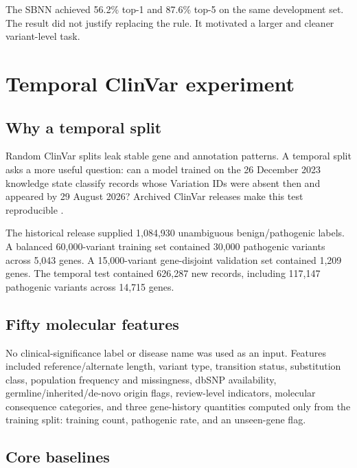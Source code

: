 \documentclass[11pt]{article}
\begin{document}
The SBNN achieved 56.2\% top-1 and 87.6\% top-5 on the same development set. The result did not justify replacing the rule. It motivated a larger and cleaner variant-level task.

\section{Temporal ClinVar experiment}

\subsection{Why a temporal split}

Random ClinVar splits leak stable gene and annotation patterns. A temporal split asks a more useful question: can a model trained on the 26 December 2023 knowledge state classify records whose Variation IDs were absent then and appeared by 29 August 2026? Archived ClinVar releases make this test reproducible \citep{clinvar}.

The historical release supplied 1,084,930 unambiguous benign/pathogenic labels. A balanced 60,000-variant training set contained 30,000 pathogenic variants across 5,043 genes. A 15,000-variant gene-disjoint validation set contained 1,209 genes. The temporal test contained 626,287 new records, including 117,147 pathogenic variants across 14,715 genes.
\subsection{Fifty molecular features}

No clinical-significance label or disease name was used as an input. Features included reference/alternate length, variant type, transition status, substitution class, population frequency and missingness, dbSNP availability, germline/inherited/de-novo origin flags, review-level indicators, molecular consequence categories, and three gene-history quantities computed only from the training split: training count, pathogenic rate, and an unseen-gene flag.

\subsection{Core baselines}
\end{document}
